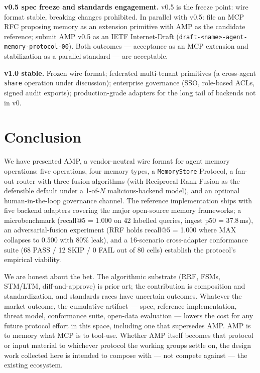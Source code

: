 \documentclass[11pt,letterpaper,twocolumn]{article}
\begin{document}
\textbf{v0.5 spec freeze and standards engagement.} v0.5 is the freeze point: wire format stable, breaking changes prohibited. In parallel with v0.5: file an MCP RFC proposing memory as an extension primitive with AMP as the candidate reference; submit AMP v0.5 as an IETF Internet-Draft (\texttt{draft-<name>-agent-memory-protocol-00}). Both outcomes --- acceptance as an MCP extension and stabilization as a parallel standard --- are acceptable.

\textbf{v1.0 stable.} Frozen wire format; federated multi-tenant primitives (a cross-agent \texttt{share} operation under discussion); enterprise governance (SSO, role-based ACLs, signed audit exports); production-grade adapters for the long tail of backends not in v0.

\section{Conclusion}
\label{sec:conclusion}

We have presented AMP, a vendor-neutral wire format for agent memory operations: five operations, four memory types, a \texttt{MemoryStore} Protocol, a fan-out router with three fusion algorithms (with Reciprocal Rank Fusion as the defensible default under a 1-of-$N$ malicious-backend model), and an optional human-in-the-loop governance channel. The reference implementation ships with five backend adapters covering the major open-source memory frameworks; a microbenchmark (recall@5 = 1.000 on 42 labelled queries, ingest p50 = 37.8\,ms), an adversarial-fusion experiment (RRF holds recall@5 = 1.000 where MAX collapses to 0.500 with 80\% leak), and a 16-scenario cross-adapter conformance suite (68 PASS / 12 SKIP / 0 FAIL out of 80 cells) establish the protocol's empirical viability.

We are honest about the bet. The algorithmic substrate (RRF, FSMs, STM/LTM, diff-and-approve) is prior art; the contribution is composition and standardization, and standards races have uncertain outcomes. Whatever the market outcome, the cumulative artifact --- spec, reference implementation, threat model, conformance suite, open-data evaluation --- lowers the cost for any future protocol effort in this space, including one that supersedes AMP. AMP is to memory what MCP is to tool-use. Whether AMP itself becomes that protocol or input material to whichever protocol the working groups settle on, the design work collected here is intended to compose with --- not compete against --- the existing ecosystem.
\end{document}
